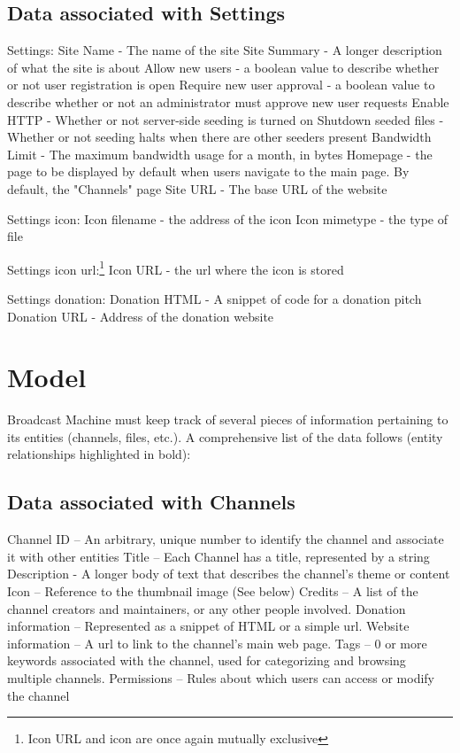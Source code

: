 \documentclass[a4paper,12pt]{report}
\begin{document}
\subsection{Data associated with Settings}
Settings:
    Site Name - The name of the site
    Site Summary - A longer description of what the site is about
    Allow new users - a boolean value to describe whether or not user registration is open
    Require new user approval - a boolean value to describe whether or not an administrator must approve new user requests
    Enable HTTP - Whether or not server-side seeding is turned on
    Shutdown seeded files - Whether or not seeding halts when there are other seeders present
    Bandwidth Limit - The maximum bandwidth usage for a month, in bytes
    Homepage - the page to be displayed by default when users navigate to the main page. By default, the "Channels" page
    Site URL - The base URL of the website

Settings icon:
    Icon filename - the address of the icon
    Icon mimetype - the type of file
    
Settings icon url:\footnote{Icon URL and icon are once again mutually exclusive}
    Icon URL - the url where the icon is stored

Settings donation:
    Donation HTML - A snippet of code for a donation pitch
    Donation URL - Address of the donation website

\section{Model}
Broadcast Machine must keep track of several pieces of information pertaining to its entities (channels, files, etc.).
A comprehensive list of the data follows (entity relationships highlighted in bold):

\subsection{Data associated with Channels}
Channel ID – An arbitrary, unique number to identify the channel and  associate it with other entities
Title – Each Channel has a title, represented by a string
Description - A longer body of text that describes the channel's theme or content
Icon – Reference to the thumbnail image (See below)
Credits – A list of the channel creators and maintainers, or any other people involved.
Donation information – Represented as a snippet of HTML or a simple url.
Website information – A url to link to the channel's main web page.
Tags – 0 or more keywords associated with the channel, used for categorizing and browsing multiple channels.
Permissions – Rules about which users can access or modify the channel
\end{document}
